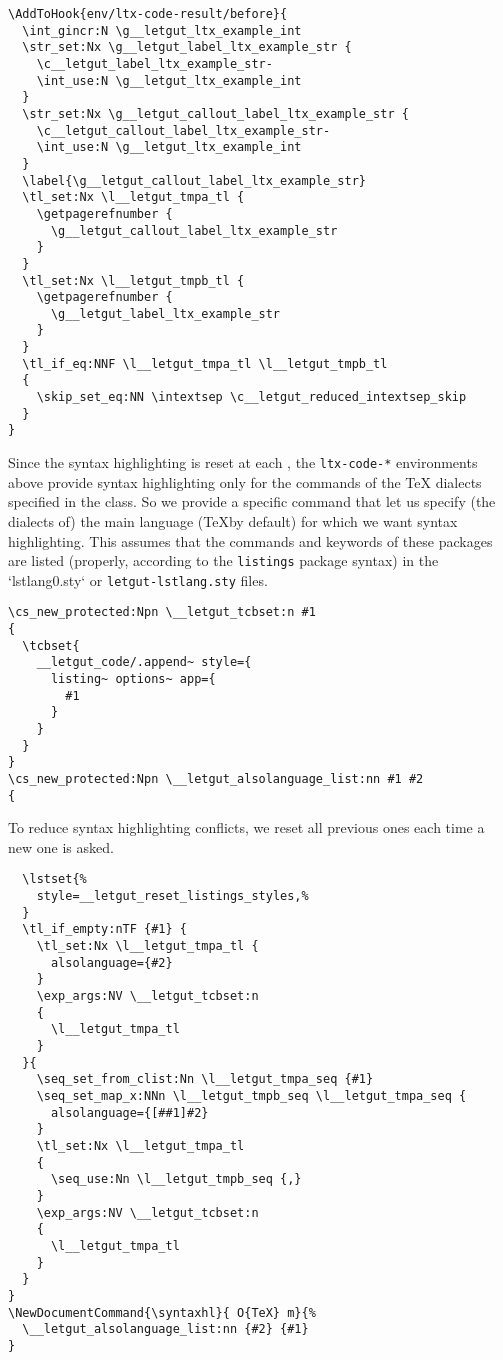 \documentclass{letgut}
\begin{document}
\begin{lstlisting}
\AddToHook{env/ltx-code-result/before}{
  \int_gincr:N \g__letgut_ltx_example_int
  \str_set:Nx \g__letgut_label_ltx_example_str {
    \c__letgut_label_ltx_example_str-
    \int_use:N \g__letgut_ltx_example_int
  }
  \str_set:Nx \g__letgut_callout_label_ltx_example_str {
    \c__letgut_callout_label_ltx_example_str-
    \int_use:N \g__letgut_ltx_example_int
  }
  \label{\g__letgut_callout_label_ltx_example_str}
  \tl_set:Nx \l__letgut_tmpa_tl {
    \getpagerefnumber {
      \g__letgut_callout_label_ltx_example_str
    }
  }
  \tl_set:Nx \l__letgut_tmpb_tl {
    \getpagerefnumber {
      \g__letgut_label_ltx_example_str
    }
  }
  \tl_if_eq:NNF \l__letgut_tmpa_tl \l__letgut_tmpb_tl
  {
    \skip_set_eq:NN \intextsep \c__letgut_reduced_intextsep_skip
  }
}
\end{lstlisting}

Since the syntax highlighting is reset at each \lstinline++, the \lstinline+ltx-code-*+
environments above provide syntax highlighting only for the commands of the \TeX
dialects specified in the class. So we provide a specific command that let us
specify (the dialects of) the main language (\TeX by default) for which we want
syntax highlighting. This assumes that the commands and keywords of these
packages are listed (properly, according to the \lstinline+listings+ package syntax) in
the `lstlang0.sty` or \lstinline+letgut-lstlang.sty+ files.

\begin{lstlisting}
\cs_new_protected:Npn \__letgut_tcbset:n #1
{
  \tcbset{
    __letgut_code/.append~ style={
      listing~ options~ app={
        #1
      }
    }
  }
}
\cs_new_protected:Npn \__letgut_alsolanguage_list:nn #1 #2
{
\end{lstlisting}
To reduce syntax highlighting conflicts, we reset all previous ones each
time a new one is asked.
\begin{lstlisting}
  \lstset{%
    style=__letgut_reset_listings_styles,%
  }
  \tl_if_empty:nTF {#1} {
    \tl_set:Nx \l__letgut_tmpa_tl {
      alsolanguage={#2}
    }
    \exp_args:NV \__letgut_tcbset:n
    {
      \l__letgut_tmpa_tl
    }
  }{
    \seq_set_from_clist:Nn \l__letgut_tmpa_seq {#1}
    \seq_set_map_x:NNn \l__letgut_tmpb_seq \l__letgut_tmpa_seq {
      alsolanguage={[##1]#2}
    }
    \tl_set:Nx \l__letgut_tmpa_tl
    {
      \seq_use:Nn \l__letgut_tmpb_seq {,}
    }
    \exp_args:NV \__letgut_tcbset:n
    {
      \l__letgut_tmpa_tl
    }
  }
}
\NewDocumentCommand{\syntaxhl}{ O{TeX} m}{%
  \__letgut_alsolanguage_list:nn {#2} {#1}
}
\end{lstlisting}
\end{document}
